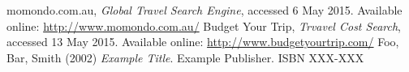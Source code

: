 \documentclass[12pt]{article}
\begin{document}

\begin{thebibliography}{99}
momondo.com.au,
\emph{Global Travel Search Engine}, accessed 6 May 2015.
Available online: \url{http://www.momondo.com.au/}
Budget Your Trip,
\emph{Trvavel Cost Search}, accessed 13 May 2015.
Available online: \url{http://www.budgetyourtrip.com/}
Foo, Bar, Smith (2002)
\emph{Example Title}.
Example Publisher. ISBN XXX-XXX
\end{thebibliography}




\end{document}
